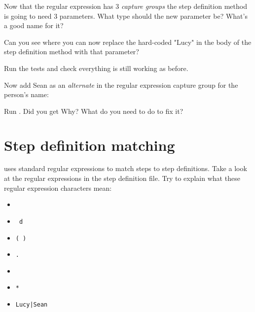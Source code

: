     Now that the regular expression has 3 \emph{capture groups} the step definition method is going to need 3 parameters. What type should the new parameter be? What's a good name for it?
    
    Can you see where you can now replace the hard-coded "Lucy" in the body of the step definition method with that parameter?
    
    Run the tests and check everything is still working as before.
    
    Now add Sean as an \emph{alternate} in the regular expression capture group for the person's name:
    
    
    Run \CUKE{}. Did you get  Why? What do you need to do to fix it?
    
    
    \section*{Step definition matching}
    
    \CUKE{} uses standard regular expressions to match steps to step definitions. Take a look at the regular expressions in the step definition file. Try to explain what these regular expression characters mean:
    
    \begin{itemize}
        \JAVA{\item \texttt{\CARET}}
        \RUBY{\item \texttt{\CARET}}
        \JAVASCRIPT{\item \texttt{\CARET}}
        \item \texttt{\DOLLAR}
        \item \texttt{\JAVA{\DOUBLEBACKSLASH} \CSHARP{\BACKSLASH} \JAVASCRIPT{\BACKSLASH}\RUBY{\BACKSLASH}d}
        \item \texttt{(   )}
        \item \texttt{.}
        \item \texttt{\PLUS}
        \item \texttt{*}
        \item \texttt{Lucy|Sean}
    \end{itemize}
\fi    
